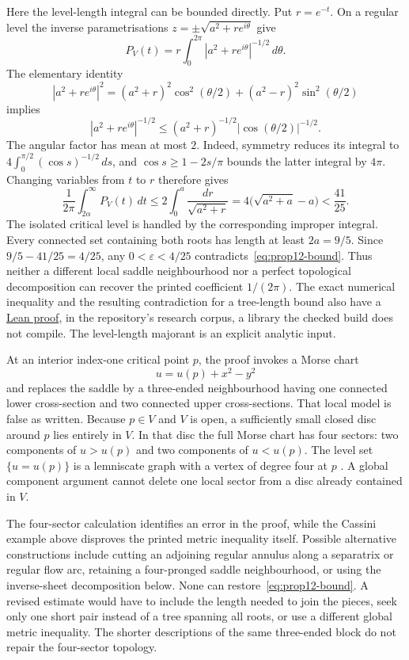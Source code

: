 Here the level-length integral can be bounded directly. Put $r=e^{-t}$.
On a regular level the inverse parametrisations
$z=\pm\sqrt{a^2+re^{i\theta}}$ give
\[
 P_V(t)=r\int_0^{2\pi}|a^2+re^{i\theta}|^{-1/2}\,d\theta.
\]
The elementary identity
\[
 |a^2+re^{i\theta}|^2
 =(a^2+r)^2\cos^2(\theta/2)+(a^2-r)^2\sin^2(\theta/2)
\]
implies
\[
 |a^2+re^{i\theta}|^{-1/2}
 \le(a^2+r)^{-1/2}|\cos(\theta/2)|^{-1/2}.
\]
The angular factor has mean at most $2$. Indeed, symmetry reduces its
integral to $4\int_0^{\pi/2}(\cos s)^{-1/2}\,ds$, and
$\cos s\ge1-2s/\pi$ bounds the latter integral by $4\pi$.
Changing variables from $t$ to $r$ therefore gives
\[
 \frac1{2\pi}\int_{2\alpha}^{\infty}P_V(t)\,dt
 \le2\int_0^a\frac{dr}{\sqrt{a^2+r}}
 =4\bigl(\sqrt{a^2+a}-a\bigr)<\frac{41}{25}.
\]
The isolated critical level is handled by the corresponding improper
integral. Every connected set containing both roots has length at least
$2a=9/5$. Since $9/5-41/25=4/25$, any
$0<\varepsilon<4/25$ contradicts~\eqref{eq:prop12-bound}.  Thus neither a different local saddle neighbourhood nor a perfect
topological decomposition can recover the printed coefficient $1/(2\pi)$.
The exact numerical inequality and the resulting contradiction for a
tree-length bound also have a \href{https://github.com/wcook04/plectis-erdos/blob/e6c2d8f77ac24753c5216a49f4daf7f7388b309f/research_corpus/Erdos1041/CassiniTreeBudget.lean\#L117}{Lean proof}, in the repository's
research corpus, a library the checked build does not compile. The
level-length majorant is an explicit analytic input.

At an interior index-one critical point $p$, the proof invokes a Morse chart
\[
 u=u(p)+x^2-y^2
\]
and replaces the saddle by a three-ended neighbourhood having one connected
lower cross-section and two connected upper cross-sections.  That local model
is false as written.  Because $p\in V$ and $V$ is open, a sufficiently small
closed disc around $p$ lies entirely in $V$.  In that disc the full Morse chart
has four sectors: two components of $u>u(p)$ and two components of $u<u(p)$.
The level set $\{u=u(p)\}$ is a lemniscate graph with a vertex of degree four
at $p$ \cite[Definition~1.2 and Proposition~2.4]{bishoperemenkolazebnik2025}.
A global component argument cannot delete one local sector from a disc already
contained in $V$.

The four-sector calculation identifies an error in the proof, while the
Cassini example above disproves the printed metric inequality itself.
Possible alternative constructions include cutting an adjoining regular
annulus along a separatrix or regular flow arc, retaining a four-pronged
saddle neighbourhood, or using the inverse-sheet decomposition below.
None can restore~\eqref{eq:prop12-bound}. A revised estimate would have
to include the length needed to join the pieces, seek only one short
pair instead of a tree spanning all roots, or use a different global
metric inequality.
The shorter descriptions of the same three-ended block do not repair the
four-sector topology.

